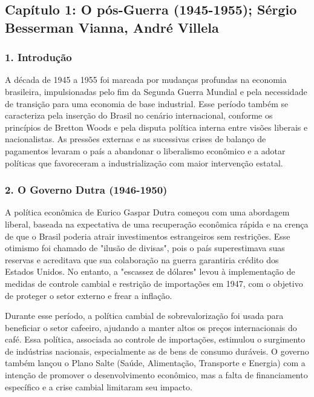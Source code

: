\documentclass[a4paper,12pt]{article}[abntex2]
\begin{document}
\newpage
\subsection{\textbf{Capítulo 1: O pós-Guerra (1945-1955); Sérgio Besserman Vianna, André Villela}}

\subsubsection{\textbf{1. Introdução}}

A década de 1945 a 1955 foi marcada por mudanças profundas na economia brasileira, impulsionadas pelo fim da Segunda Guerra Mundial e pela necessidade de transição para uma economia de base industrial. Esse período também se caracteriza pela inserção do Brasil no cenário internacional, conforme os princípios de Bretton Woods e pela disputa política interna entre visões liberais e nacionalistas. As pressões externas e as sucessivas crises de balanço de pagamentos levaram o país a abandonar o liberalismo econômico e a adotar políticas que favoreceram a industrialização com maior intervenção estatal.

\subsubsection{\textbf{2. O Governo Dutra (1946-1950)}}

A política econômica de Eurico Gaspar Dutra começou com uma abordagem liberal, baseada na expectativa de uma recuperação econômica rápida e na crença de que o Brasil poderia atrair investimentos estrangeiros sem restrições. Esse otimismo foi chamado de "ilusão de divisas", pois o país superestimava suas reservas e acreditava que sua colaboração na guerra garantiria crédito dos Estados Unidos. No entanto, a "escassez de dólares" levou à implementação de medidas de controle cambial e restrição de importações em 1947, com o objetivo de proteger o setor externo e frear a inflação.

Durante esse período, a política cambial de sobrevalorização foi usada para beneficiar o setor cafeeiro, ajudando a manter altos os preços internacionais do café. Essa política, associada ao controle de importações, estimulou o surgimento de indústrias nacionais, especialmente as de bens de consumo duráveis. O governo também lançou o Plano Salte (Saúde, Alimentação, Transporte e Energia) com a intenção de promover o desenvolvimento econômico, mas a falta de financiamento específico e a crise cambial limitaram seu impacto.
\end{document}
